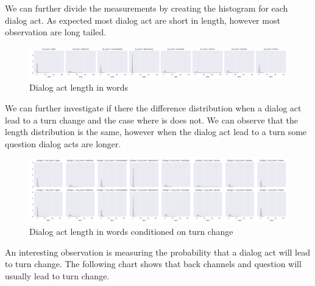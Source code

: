 We can further divide the measurements by creating the histogram for each dialog act. As expected most dialog act are short in length, however most observation are long tailed.


 \begin{figure}
 \centering
 \includegraphics[width=\textwidth]{../scikitlearn/figures/grid_secs_by_da_name.pdf}
 \caption{Dialog act length in words \label{overflow}}
 \end{figure}
 
 We can further investigate if there the difference distribution when a dialog act lead to a turn change
 and the case where is does not. We can observe that the length distribution is the same, however when the 
 dialog act lead to a turn some question dialog acts are longer. 

\begin{figure}
 \centering
 \includegraphics[width=\textwidth]{../scikitlearn/figures/grid_secs_by_da_name_by_tchange.pdf}
 \caption{Dialog act length in words conditioned on turn change\label{overflow}}
 \end{figure}
 
An interesting observation is measuring the probability that a dialog act will lead to turn change. 
The following chart shows that back channels and question will usually lead to turn change. 

